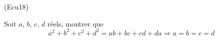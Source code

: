\begin{tiny}(Ecu18)\end{tiny} Soit $a$, $b$, $c$, $d$ réels, montrer que
\begin{displaymath}
 a^2+b^2+c^2+d^2 = ab +bc + cd + da \Rightarrow a = b = c =d 
\end{displaymath}
